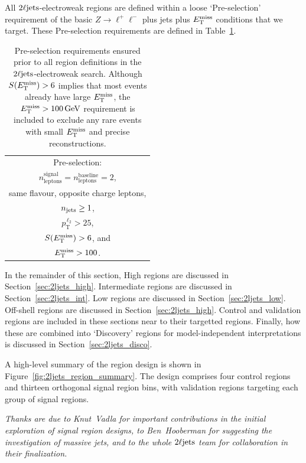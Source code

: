 All $\twoljets$-electroweak regions are defined within a loose `Pre-selection'
requirement of the basic $Z\to \ell^+\ell^-$ plus jets plus $\met$
conditions that we target.
These Pre-selection requirements are defined in Table~\ref{tab:2ljets_presel}.

\begin{table}[tp]
\centering
\begin{tabular}{c}
Pre-selection:
\\[1em]
$n_\mathrm{leptons}^\mathrm{signal} = n_\mathrm{leptons}^\mathrm{baseline} = 2$,
\\[0.5em]
same flavour, opposite charge leptons,
\\[0.5em]
$\njet \geq 1$,
\\[0.5em]
$p_\mathrm{T}^{\,\ell_2} > 25$,
\\[0.5em]
\hphantom{~and}$\metsig > 6$, and
\\[0.5em]
$\met > 100$.
\end{tabular}
\caption[%
Pre-selection requirements ensured prior to all region definitions in the
$\twoljets$-electroweak search
]{%
Pre-selection requirements ensured prior to all region definitions in the
$\twoljets$-electroweak search.
Although $\metsig > 6$ implies that most events already have large $\met$, the
$\met > 100\,\eV[G]$ requirement is included to exclude any rare events with
small $\met$ and precise reconstructions.
}
\label{tab:2ljets_presel}
\end{table}

In the remainder of this section,
High regions are discussed in Section~\ref{sec:2ljets_high}.
Intermediate regions are discussed in Section~\ref{sec:2ljets_int}.
Low regions are discussed in Section~\ref{sec:2ljets_low}.
Off-shell regions are discussed in Section~\ref{sec:2ljets_high}.
Control and validation regions are included in these sections near to their
targetted regions.
Finally, how these are combined into `Discovery' regions for
model-independent interpretations is discussed in
Section~\ref{sec:2ljets_disco}.

A high-level summary of the region design is shown in
Figure~\ref{fig:2ljets_region_summary}.
The design comprises four control regions and thirteen orthogonal signal region
bins, with validation regions targeting each group of signal regions.

\emph{%
Thanks are due to Knut~Vadla for important contributions in the initial
exploration of signal region designs,
to Ben~Hooberman for suggesting the investigation of massive jets,
and to the whole $\twoljets$ team for collaboration in their finalization.
}


